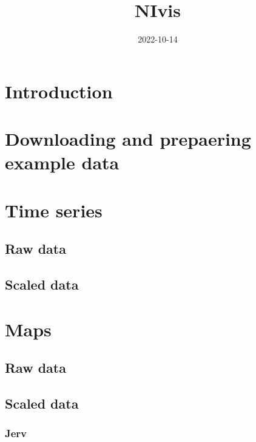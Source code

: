 \documentclass[
]{book}
\title{NIvis}
\author{}
\date{\vspace{-2.5em}2022-10-14}
\begin{document}
\maketitle

{
\setcounter{tocdepth}{1}
\tableofcontents
}
\hypertarget{introduction}{%
\chapter{Introduction}\label{introduction}}

\hypertarget{downloading-and-prepaering-example-data}{%
\chapter{Downloading and prepaering example data}\label{downloading-and-prepaering-example-data}}

\hypertarget{cross}{%
\chapter{Time series}\label{cross}}

\hypertarget{raw-data}{%
\section{Raw data}\label{raw-data}}

\hypertarget{scaled-data}{%
\section{Scaled data}\label{scaled-data}}

\hypertarget{maps}{%
\chapter{Maps}\label{maps}}

\hypertarget{raw-data-1}{%
\section{Raw data}\label{raw-data-1}}

\hypertarget{scaled-data-1}{%
\section{Scaled data}\label{scaled-data-1}}

\hypertarget{jerv}{%
\subsection{Jerv}\label{jerv}}
\end{document}
